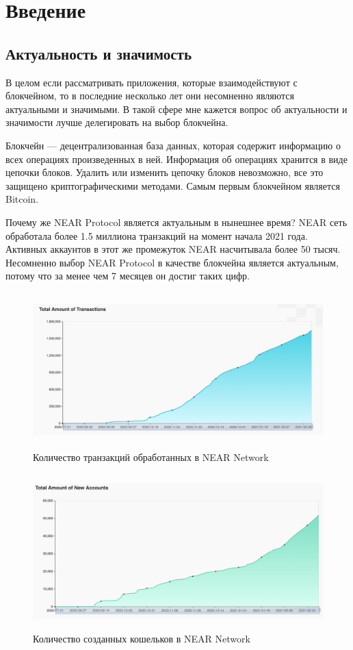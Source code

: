\section{Введение}
\subsection{Актуальность и значимость}

В целом если рассматривать приложения, которые взаимодействуют с блокчейном, то в последние несколько лет они несомненно являются актуальными и значимыми\cite{DBLP:journals/corr/abs-1712-04649}. В такой сфере мне кажется вопрос об актуальности и значимости лучше делегировать на выбор блокчейна.

\begin{definition}
    Блокчейн --- децентрализованная база данных, которая содержит информацию о всех операциях произведенных в ней.
    Информация об операциях хранится в виде цепочки блоков.  Удалить или изменить цепочку блоков невозможно, все это защищено криптографическими методами. Самым первым блокчейном является Bitcoin\cite{nakamoto2012bitcoin}.
\end{definition}

Почему же NEAR Protocol является актуальным в нынешнее время? NEAR сеть обработала более 1.5 миллиона транзакций на момент начала 2021 года. Активных аккаунтов в этот же промежуток NEAR насчитывала более 50 тысяч. Несомненно выбор NEAR Protocol в качестве блокчейна является актуальным, потому что за менее чем 7 месяцев он достиг таких цифр.

\begin{figure}[H]
	\centering
	\includegraphics[height=60mm]{fig/near_1.png}
	\caption{Количество транзакций обработанных в NEAR Network}
\end{figure}


\begin{figure}[H]
	\centering
	\includegraphics[height=60mm]{fig/near_2.png}
	\caption{Количество созданных кошельков в NEAR Network}
\end{figure}

